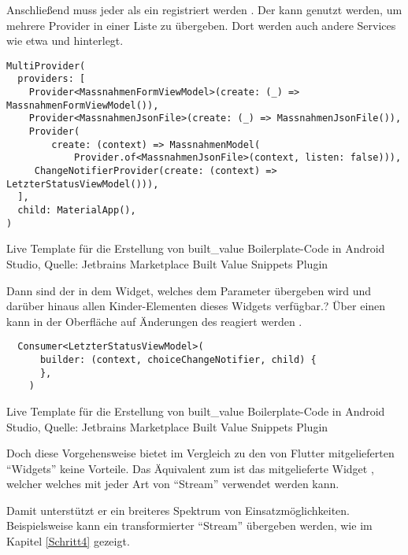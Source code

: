 Anschließend muss jeder  als ein  registriert werden . 
Der  kann genutzt werden, um mehrere Provider in einer Liste zu übergeben.
Dort werden auch andere Services wie etwa   und   hinterlegt.

\ifIncludeFigures
  \begin{listing}[h]
    \begin{verbatim}
MultiProvider(
  providers: [
    Provider<MassnahmenFormViewModel>(create: (_) => MassnahmenFormViewModel()),
    Provider<MassnahmenJsonFile>(create: (_) => MassnahmenJsonFile()),
    Provider(
        create: (context) => MassnahmenModel(
            Provider.of<MassnahmenJsonFile>(context, listen: false))),
     ChangeNotifierProvider(create: (context) => LetzterStatusViewModel())),
  ],
  child: MaterialApp(),
)
\end{verbatim}
    \caption[built_value Live Template]{Live Template für die Erstellung von built_value Boilerplate-Code in Android Studio, Quelle: Jetbrains Marketplace Built Value Snippets Plugin}
    \label{lst:MultiProvider}
  \end{listing}
\fi

Dann sind der  in dem Widget, welches dem Parameter  übergeben wird und darüber hinaus allen Kinder-Elementen dieses Widgets verfügbar.?
Über einen  kann in der Oberfläche auf Änderungen des  reagiert werden \Lst{\ref{lst:Consumer}}.

\ifIncludeFigures
  \begin{listing}[h]
    \begin{verbatim}
  Consumer<LetzterStatusViewModel>(
      builder: (context, choiceChangeNotifier, child) {
      },
    )
\end{verbatim}
    \caption[built_value Live Template]{Live Template für die Erstellung von built_value Boilerplate-Code in Android Studio, Quelle: Jetbrains Marketplace Built Value Snippets Plugin}
    \label{lst:Consumer}
  \end{listing}
\fi


Doch diese Vorgehensweise bietet im Vergleich zu den von Flutter mitgelieferten \enquote{Widgets} keine Vorteile.
Das Äquivalent zum  ist das mitgelieferte Widget ,
welcher welches mit jeder Art von \enquote{Stream} verwendet werden kann.

Damit unterstützt er ein breiteres Spektrum von Einsatzmöglichkeiten.
Beispielsweise kann ein transformierter \enquote{Stream} übergeben werden, wie im Kapitel \ref{Schritt4} gezeigt.

